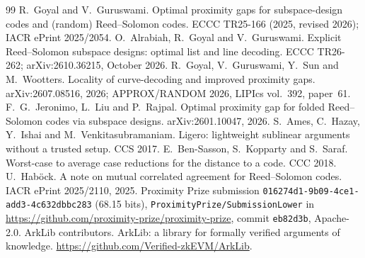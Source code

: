 \documentclass[11pt]{article}
\theoremstyle{definition}
\theoremstyle{remark}
\begin{document}
\begin{thebibliography}{99}
 R.~Goyal and V.~Guruswami. Optimal proximity gaps for subspace-design codes and
(random) Reed--Solomon codes. ECCC TR25-166 (2025, revised 2026); IACR ePrint 2025/2054.
 O.~Alrabiah, R.~Goyal and V.~Guruswami. Explicit Reed--Solomon subspace designs:
optimal list and line decoding. ECCC TR26-262; arXiv:2610.36215, October 2026.
 R.~Goyal, V.~Guruswami, Y.~Sun and M.~Wootters. Locality of curve-decoding and
improved proximity gaps. arXiv:2607.08516, 2026; APPROX/RANDOM 2026, LIPIcs vol.~392, paper~61.
 F.~G.~Jeronimo, L.~Liu and P.~Rajpal. Optimal proximity gap for folded
Reed--Solomon codes via subspace designs. arXiv:2601.10047, 2026.
 S.~Ames, C.~Hazay, Y.~Ishai and M.~Venkitasubramaniam. Ligero: lightweight
sublinear arguments without a trusted setup. CCS 2017.
 E.~Ben-Sasson, S.~Kopparty and S.~Saraf. Worst-case to average case reductions for
the distance to a code. CCC 2018.
 U.~Hab\"ock. A note on mutual correlated agreement for Reed--Solomon codes. IACR
ePrint 2025/2110, 2025.
 Proximity Prize submission \texttt{016274d1-9b09-4ce1-add3-4c632dbbc283}
(68.15 bits), \texttt{ProximityPrize/SubmissionLower} in
\url{https://github.com/proximity-prize/proximity-prize}, commit \texttt{eb82d3b}, Apache-2.0.
 ArkLib contributors. ArkLib: a library for formally verified arguments of
knowledge. \url{https://github.com/Verified-zkEVM/ArkLib}.
\end{thebibliography}
\end{document}
